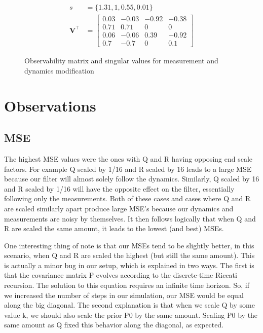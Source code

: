\documentclass[11pt, letterpaper, twocolumn]{article}
\begin{document}
\begin{figure}[h]
    \centering
    \[ \begin{aligned}
        s &= \{ 1.31, 1, 0.55, 0.01 \} \\
        \bm{V}^\top &= \begin{bmatrix}
            0.03 & -0.03 & -0.92 & -0.38 \\
            0.71 & 0.71 & 0 & 0 \\
            0.06 & -0.06 & 0.39 & -0.92 \\
            0.7 & -0.7 & 0 & 0.1
        \end{bmatrix}
    \end{aligned} 
    \]
    \caption{Observability matrix and singular values for measurement and dynamics modification}
    \label{fig:modified}
\end{figure}

\pagebreak

\section*{Observations}

\subsection*{MSE}

The highest MSE values were the ones with Q and R having opposing end
scale factors. For example Q scaled by 1/16 and R scaled by 16 leads to
a large MSE because our filter will almost solely follow the dynamics.
Similarly, Q scaled by 16 and R scaled by 1/16 will have the opposite
effect on the filter, essentially following only the measurements. Both
of these cases and cases where Q and R are scaled similarly apart produce
large MSE's because our dynamics and measurements are noisy by themselves.
It then follows logically that when Q and R are scaled the same amount, it
leads to the lowest (and best) MSEs. 

One interesting thing of note is that
our MSEs tend to be slightly better, in this scenario, when Q and R are
scaled the highest (but still the same amount). This is actually a minor
bug in our setup, which is explained in two ways. The first is that the 
covariance matrix P evolves according to the discrete-time Riccati recursion.
The solution to this equation requires an infinite time horizon. So, if we 
increased the number of steps in our simulation, our MSE would be equal along
the big diagonal. The second explanation is that when we scale Q by
some value k, we should also scale the prior P0 by the same amount. Scaling
P0 by the same amount as Q fixed this behavior along the diagonal, as expected.
\end{document}
